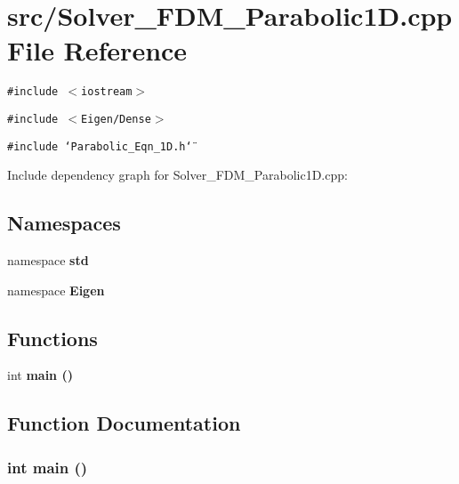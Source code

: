\section{src/Solver\_\-FDM\_\-Parabolic1D.cpp File Reference}
\label{Solver__FDM__Parabolic1D_8cpp}
{\tt \#include $<$iostream$>$}\par
{\tt \#include $<$Eigen/Dense$>$}\par
{\tt \#include \char`\"{}Parabolic\_\-Eqn\_\-1D.h\char`\"{}}\par


Include dependency graph for Solver\_\-FDM\_\-Parabolic1D.cpp:\subsection*{Namespaces}
\begin{CompactItemize}
\item 
namespace \bf{std}
\item 
namespace \bf{Eigen}
\end{CompactItemize}
\subsection*{Functions}
\begin{CompactItemize}
\item 
int \bf{main} ()
\end{CompactItemize}


\subsection{Function Documentation}
\subsubsection{\setlength{\rightskip}{0pt plus 5cm}int main ()}\label{Solver__FDM__Parabolic1D_8cpp_e66f6b31b5ad750f1fe042a706a4e3d4}


